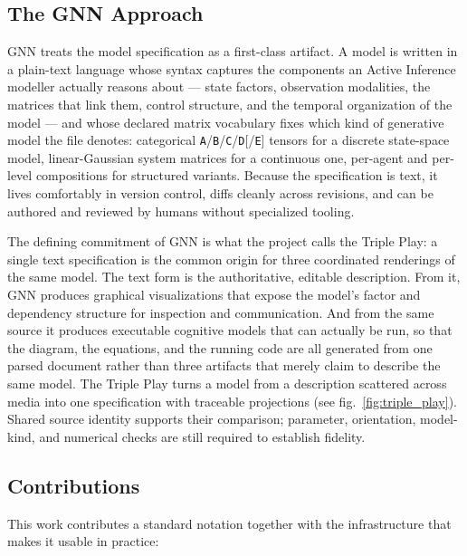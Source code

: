 \documentclass[
  english,
  9pt,
]{extarticle}
\begin{document}
\subsection{The GNN Approach}\label{the-gnn-approach}

GNN treats the model specification as a first-class artifact. A model is
written in a plain-text language whose syntax captures the components an
Active Inference modeller actually reasons about --- state factors,
observation modalities, the matrices that link them, control structure,
and the temporal organization of the model --- and whose declared matrix
vocabulary fixes which kind of generative model the file denotes:
categorical \texttt{A}/\texttt{B}/\texttt{C}/\texttt{D}{[}/\texttt{E}{]}
tensors for a discrete state-space model, linear-Gaussian system
matrices for a continuous one, per-agent and per-level compositions for
structured variants. Because the specification is text, it lives
comfortably in version control, diffs cleanly across revisions, and can
be authored and reviewed by humans without specialized tooling.

The defining commitment of GNN is what the project calls the Triple
Play: a single text specification is the common origin for three
coordinated renderings of the same model. The text form is the
authoritative, editable description. From it, GNN produces graphical
visualizations that expose the model's factor and dependency structure
for inspection and communication. And from the same source it produces
executable cognitive models that can actually be run, so that the
diagram, the equations, and the running code are all generated from one
parsed document rather than three artifacts that merely claim to
describe the same model. The Triple Play turns a model from a
description scattered across media into one specification with traceable
projections (see fig.~\ref{fig:triple_play}). Shared source identity
supports their comparison; parameter, orientation, model-kind, and
numerical checks are still required to establish fidelity.

\subsection{Contributions}\label{contributions}

This work contributes a standard notation together with the
infrastructure that makes it usable in practice:
\end{document}
